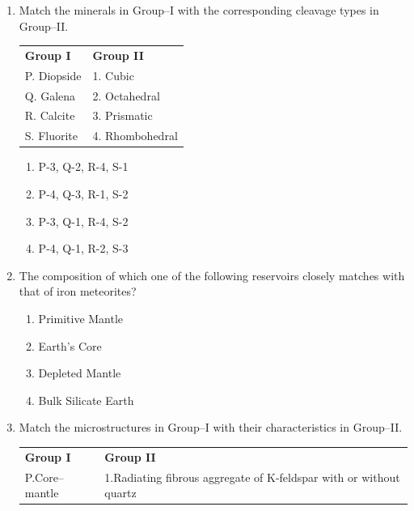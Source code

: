 \documentclass[journal,12pt,onecolumn]{IEEEtran}
\begin{document}
\begin{enumerate}
\item Match the minerals in Group–I with the corresponding cleavage types in Group–II.  

\begin{tabular}{p{} p{}}
\textbf{Group I} & \textbf{Group II} \\
P. Diopside & 1. Cubic \\
Q. Galena & 2. Octahedral \\
R. Calcite & 3. Prismatic  \\
S. Fluorite & 4. Rhombohedral \\
\end{tabular}  

\hfill{}

\begin{multicols}{2}
\begin{enumerate}
\item P-3, Q-2, R-4, S-1
\item P-4, Q-3, R-1, S-2
\item P-3, Q-1, R-4, S-2
\item P-4, Q-1, R-2, S-3
\end{enumerate}
\end{multicols}



\item The composition of which one of the following reservoirs closely matches with that of iron meteorites?  

\hfill{}

\begin{multicols}{2}
\begin{enumerate}
\item Primitive Mantle
\item Earth’s Core
\item Depleted Mantle
\item Bulk Silicate Earth
\end{enumerate}
\end{multicols}






\item Match the microstructures in Group–I with their characteristics in Group–II.  

\begin{tabular}{p{} p{}}
\textbf{Group I} & \textbf{Group II} \\
P.Core–mantle & 1.Radiating fibrous aggregate of K-feldspar
with or without quartz\\
 

\end{tabular}
\end{enumerate}
\end{document}

